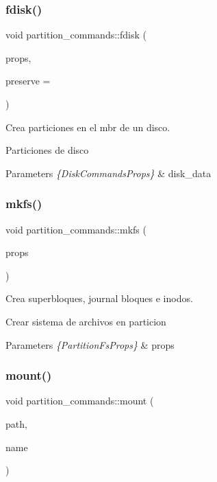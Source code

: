 \subsubsection{\texorpdfstring{fdisk()}{fdisk()}}
{\footnotesize\ttfamily void partition\+\_\+commands\+::fdisk (\begin{DoxyParamCaption}\item[{\hyperlink{structPartitionCommandsProps}{Partition\+Commands\+Props}}]{props,  }\item[{bool}]{preserve = {} }\end{DoxyParamCaption})}



Crea particiones en el mbr de un disco. 

Particiones de disco 
\begin{DoxyParams}{Parameters}
{\em \{\+Disk\+Commands\+Props\}} & disk\+\_\+data \\
\hline
\end{DoxyParams}
\mbox{\label{classpartition__commands_a41ba9bd1dfa43993e2969caac2a52250}} 
\subsubsection{\texorpdfstring{mkfs()}{mkfs()}}
{\footnotesize\ttfamily void partition\+\_\+commands\+::mkfs (\begin{DoxyParamCaption}\item[{\hyperlink{structPartitionFsProps}{Partition\+Fs\+Props}}]{props }\end{DoxyParamCaption})}



Crea superbloques, journal bloques e inodos. 

Crear sistema de archivos en particion 
\begin{DoxyParams}{Parameters}
{\em \{\+Partition\+Fs\+Props\}} & props \\
\hline
\end{DoxyParams}
\mbox{\label{classpartition__commands_aa9a9c098b234aac9cf1d42aad40b1c9f}} 
\subsubsection{\texorpdfstring{mount()}{mount()}}
{\footnotesize\ttfamily void partition\+\_\+commands\+::mount (\begin{DoxyParamCaption}\item[{string}]{path,  }\item[{string}]{name }\end{DoxyParamCaption})}



